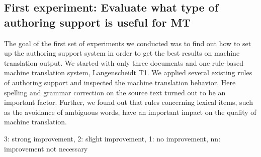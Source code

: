 \documentclass[output=paper]{LSP/langsci}
\begin{document}
\subsection{First experiment: Evaluate what type of authoring support is useful for MT}\label{sec:siegel:6.1}

The goal of the first set of experiments we conducted was to find out how to set up the authoring support system in order to get the best results on machine translation output. We started with only three documents and one rule-based machine translation system, Langenscheidt T1. We applied several existing rules of authoring support and inspected the machine translation behavior. Here spelling and grammar correction on the source text turned out to be an important factor. Further, we found out that rules concerning lexical items, such as the avoidance of ambiguous words, have an important impact on the quality of machine translation. 

\begin{table}
\textmd{3: strong improvement, 2: slight improvement, 1: no improvement, nn: improvement not necessary}
\caption{Application of rules and the effect on Google Translate and \textsc{systran} for German--English and German--Italian translation. Adapted from \citet[43]{Klausner2011}.}
\label{tab:siegel:1}
\end{table}
\end{document}
